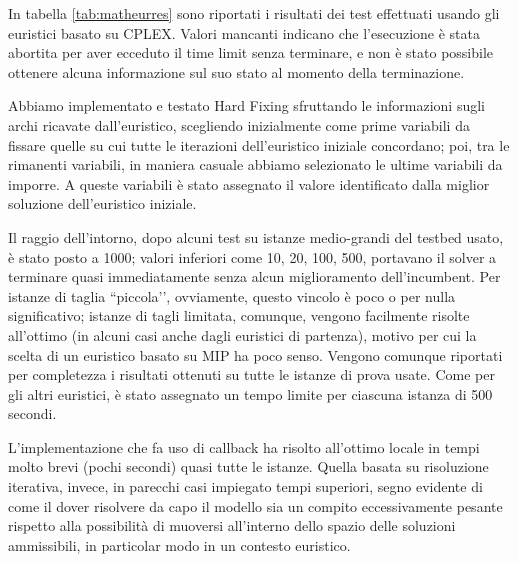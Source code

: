 In tabella \ref{tab:matheurres} sono riportati i risultati dei test effettuati usando gli euristici basato su CPLEX. Valori mancanti indicano che l'esecuzione è stata abortita per aver ecceduto il time limit senza terminare, e non è stato possibile ottenere alcuna informazione sul suo stato al momento della terminazione.

Abbiamo implementato e testato Hard Fixing sfruttando le informazioni sugli archi ricavate dall’euristico, scegliendo inizialmente come prime variabili da fissare quelle su cui tutte le iterazioni dell'euristico iniziale concordano; poi, tra le rimanenti variabili, in maniera casuale abbiamo selezionato le ultime variabili da imporre. A queste variabili è stato assegnato il valore identificato dalla miglior soluzione dell’euristico iniziale.

Il raggio dell’intorno, dopo alcuni test su istanze medio-grandi del testbed usato, è stato posto a 1000; valori inferiori come 10, 20, 100, 500, portavano il solver a terminare quasi immediatamente senza alcun miglioramento dell’incumbent. Per istanze di taglia ``piccola’’, ovviamente, questo vincolo è poco o per nulla significativo; istanze di tagli limitata, comunque, vengono facilmente risolte all’ottimo (in alcuni casi anche dagli euristici di partenza), motivo per cui la scelta di un euristico basato su MIP ha poco senso. Vengono comunque riportati per completezza i risultati ottenuti su tutte le istanze di prova usate. Come per gli altri euristici, è stato assegnato un tempo limite per ciascuna istanza di 500 secondi.

L’implementazione che fa uso di callback ha risolto all’ottimo locale in tempi molto brevi (pochi secondi) quasi tutte le istanze. Quella basata su risoluzione iterativa, invece, in parecchi casi impiegato tempi superiori, segno evidente di come il dover risolvere da capo il modello sia un compito eccessivamente pesante rispetto alla possibilità di muoversi all’interno dello spazio delle soluzioni ammissibili, in particolar modo in un contesto euristico.


